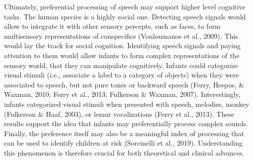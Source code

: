 \documentclass[man]{apa6}
\begin{document}
Ultimately, preferential processing of speech may support higher level
cognitive tasks. The human species is a highly social one. Detecting
speech signals would allow to integrate it with other sensory percepts,
such as faces, to form multisensory representations of conspecifics
(Vouloumanos et al., 2009). This would lay the track for social
cognition. Identifying speech signals and paying attention to them would
allow infants to form complex representations of the sensory world, that
they can manipulate cognitively. Infants could categorize visual stimuli
(i.e., associate a label to a category of objects) when they were
associated to speech, but not pure tones or backward speech (Ferry,
Hespos, \& Waxman, 2010; Ferry et al., 2013; Fulkerson \& Waxman, 2007).
Interestingly, infants categorized visual stimuli when presented with
speech, melodies, monkey (Fulkerson \& Haaf, 2003), or lemur
vocalizations (Ferry et al., 2013). These results support the idea that
infants may preferentially process complex sounds. Finally, the
preference itself may also be a meaningful index of processing that can
be used to identify children at risk (Sorcinelli et al., 2019).
Understanding this phenomenon is therefore crucial for both theoretical
and clinical advances.
\end{document}
